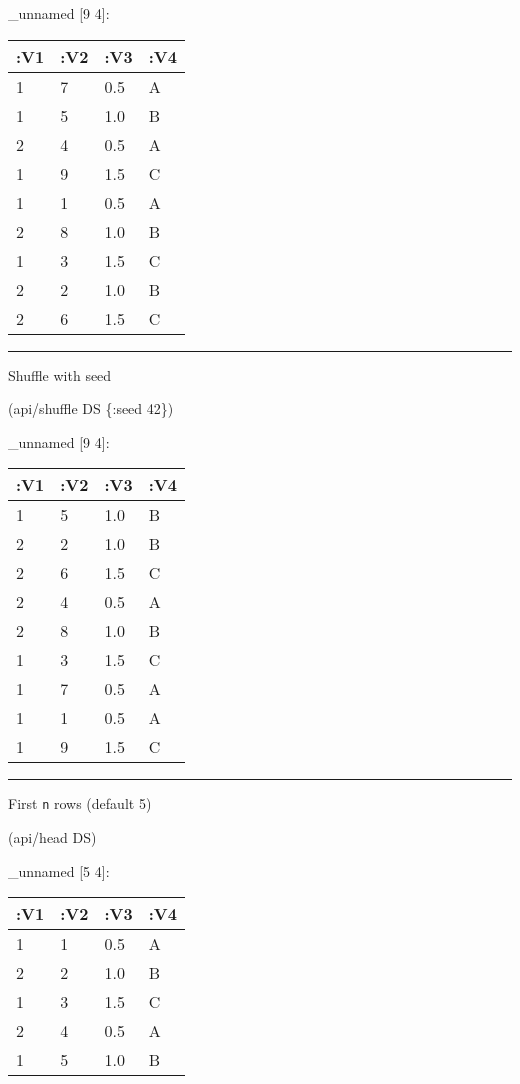 \documentclass[]{article}
\newenvironment{Shaded}{\begin{snugshade}}{\end{snugshade}}
\newcommand{\AttributeTok}[1]{\textcolor[rgb]{0.77,0.63,0.00}{#1}}
\newcommand{\DecValTok}[1]{\textcolor[rgb]{0.00,0.00,0.81}{#1}}
\newcommand{\NormalTok}[1]{#1}
\begin{document}
\_unnamed {[}9 4{]}:

\begin{longtable}[]{@{}llll@{}}
\toprule
:V1 & :V2 & :V3 & :V4\tabularnewline
\midrule
\endhead
1 & 7 & 0.5 & A\tabularnewline
1 & 5 & 1.0 & B\tabularnewline
2 & 4 & 0.5 & A\tabularnewline
1 & 9 & 1.5 & C\tabularnewline
1 & 1 & 0.5 & A\tabularnewline
2 & 8 & 1.0 & B\tabularnewline
1 & 3 & 1.5 & C\tabularnewline
2 & 2 & 1.0 & B\tabularnewline
2 & 6 & 1.5 & C\tabularnewline
\bottomrule
\end{longtable}

\begin{center}\rule{0.5\linewidth}{0.5pt}\end{center}

Shuffle with seed

\begin{Shaded}
\begin{Highlighting}[]
\NormalTok{(api/shuffle DS \{}\AttributeTok{:seed} \DecValTok{42}\NormalTok{\})}
\end{Highlighting}
\end{Shaded}

\_unnamed {[}9 4{]}:

\begin{longtable}[]{@{}llll@{}}
\toprule
:V1 & :V2 & :V3 & :V4\tabularnewline
\midrule
\endhead
1 & 5 & 1.0 & B\tabularnewline
2 & 2 & 1.0 & B\tabularnewline
2 & 6 & 1.5 & C\tabularnewline
2 & 4 & 0.5 & A\tabularnewline
2 & 8 & 1.0 & B\tabularnewline
1 & 3 & 1.5 & C\tabularnewline
1 & 7 & 0.5 & A\tabularnewline
1 & 1 & 0.5 & A\tabularnewline
1 & 9 & 1.5 & C\tabularnewline
\bottomrule
\end{longtable}

\begin{center}\rule{0.5\linewidth}{0.5pt}\end{center}

First \texttt{n} rows (default 5)

\begin{Shaded}
\begin{Highlighting}[]
\NormalTok{(api/head DS)}
\end{Highlighting}
\end{Shaded}

\_unnamed {[}5 4{]}:

\begin{longtable}[]{@{}llll@{}}
\toprule
:V1 & :V2 & :V3 & :V4\tabularnewline
\midrule
\endhead
1 & 1 & 0.5 & A\tabularnewline
2 & 2 & 1.0 & B\tabularnewline
1 & 3 & 1.5 & C\tabularnewline
2 & 4 & 0.5 & A\tabularnewline
1 & 5 & 1.0 & B\tabularnewline
\bottomrule
\end{longtable}
\end{document}

